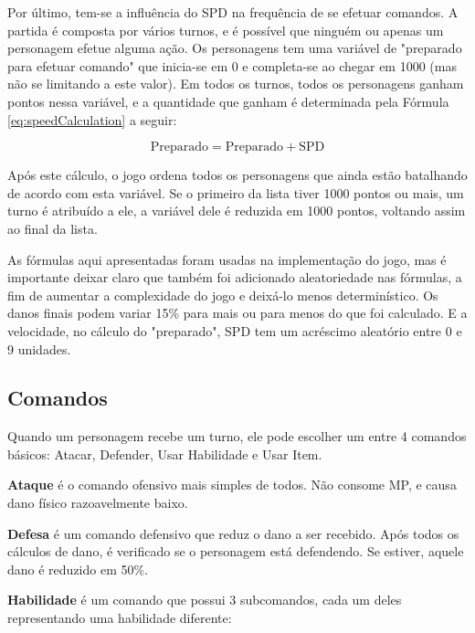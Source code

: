 \documentclass[
	12pt,					%
	openright,				%
	oneside,				%
	a4paper,				%
	bibjustif,				%
	chapter=TITLE,			%
	english,				%
	brazil,					%
	]{abntex2}
\begin{document}
	Por último, tem-se a influência do SPD na frequência de se efetuar comandos.
	A partida é composta por vários turnos,
	e é possível que ninguém ou apenas um personagem efetue alguma ação.
	Os personagens tem uma variável de "preparado para efetuar comando"{} que inicia-se em 0 e completa-se ao chegar em 1000
	(mas não se limitando a este valor).
	Em todos os turnos, todos os personagens ganham pontos nessa variável,
	e a quantidade que ganham é determinada pela Fórmula \eqref{eq:speedCalculation} a seguir:
	
	\begin{equation}
		\textrm{Preparado} = \textrm{Preparado} + \textrm{SPD}
		\label{eq:speedCalculation}
	\end{equation}
	
	\vspace{3mm}
	
	Após este cálculo,
	o jogo ordena todos os personagens que ainda estão batalhando de acordo com esta variável.
	Se o primeiro da lista tiver 1000 pontos ou mais, um turno é atribuído a ele,
	a variável dele é reduzida em 1000 pontos,
	voltando assim ao final da lista.
	
	As fórmulas aqui apresentadas foram usadas na implementação do jogo,
	mas é importante deixar claro que também foi adicionado aleatoriedade nas fórmulas,
	a fim de aumentar a complexidade do jogo e deixá-lo menos determinístico.
	Os danos finais podem variar 15\% para mais ou para menos do que foi calculado.
	E a velocidade, no cálculo do "preparado"{}, SPD tem um acréscimo aleatório entre 0 e 9 unidades.
	
	\subsection{Comandos}
	Quando um personagem recebe um turno,
	ele pode escolher um entre 4 comandos básicos:
	Atacar, Defender, Usar Habilidade e Usar Item.
	
	\textbf{Ataque} é o comando ofensivo mais simples de todos.
	Não consome MP,
	e causa dano físico razoavelmente baixo.
	
	\textbf{Defesa} é um comando defensivo que reduz o dano a ser recebido.
	Após todos os cálculos de dano,
	é verificado se o personagem está defendendo.
	Se estiver, aquele dano é reduzido em 50\%.
	
	\textbf{Habilidade} é um comando que possui 3 subcomandos,
	cada um deles representando uma habilidade diferente:
	
\end{document}
